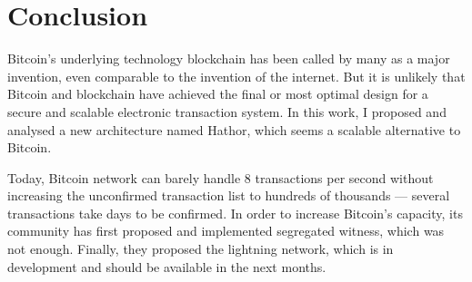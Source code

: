 



\chapter{Conclusion}

Bitcoin's underlying technology blockchain has been called by many as a major invention, even comparable to the invention of the internet. But it is unlikely that Bitcoin and blockchain have achieved the final or most optimal design for a secure and scalable electronic transaction system. In this work, I proposed and analysed a new architecture named Hathor, which seems a scalable alternative to Bitcoin.

Today, Bitcoin network can barely handle 8 transactions per second without increasing the unconfirmed transaction list to hundreds of thousands --- several transactions take days to be confirmed. In order to increase Bitcoin's capacity, its community has first proposed and implemented segregated witness, which was not enough. Finally, they proposed the lightning network, which is in development and should be available in the next months.


